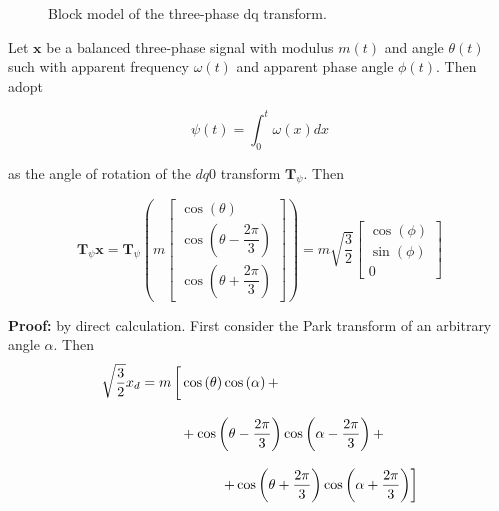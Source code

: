 \begin{figure}
\caption{Block model of the three-phase dq transform.}
\label{fig:dq0_block_modelling}
\end{figure}

\begin{theorem}\label{theo:dq0_balanced_3p} %
Let $\mathbf{x}$ be a balanced three-phase signal with modulus $m(t)$ and angle $\theta(t)$ such with apparent frequency $\omega(t)$ and apparent phase angle $\phi(t)$. Then adopt

\begin{equation} \psi(t) = \int_0^t \omega(x)dx \end{equation}

	as the angle of rotation of the $dq0$ transform $\mathbf{T}_\psi$. Then

\begin{equation} \mathbf{T}_\psi \mathbf{x} = \mathbf{T}_{\psi} \left(m\left[
	\begin{array}{c}
		\cos\left(\theta \right) \\[5mm]
		\cos\left(\theta  - \dfrac{2\pi}{3}\right) \\[5mm]
		\cos\left(\theta  + \dfrac{2\pi}{3}\right)
	\end{array}\right] \right) = 
m\sqrt{\dfrac{3}{2}}\left[
	\begin{array}{c}
		\cos\left(\phi\right) \\[5mm]
		\sin\left(\phi\right) \\[5mm]
		0
	\end{array}\right] 
\end{equation}

\end{theorem}

\textbf{Proof:} by direct calculation. First consider the Park transform of an arbitrary angle $\alpha$. Then
\begin{align}
\sqrt{\dfrac{3}{2}} x_d
	&= m\left[\raisebox{5mm}{}\cos\left(\theta\right)\cos\left(\alpha\right) + \right. \nonumber\\[3mm]
	&\hspace{1cm} +\cos\left(\theta - \dfrac{2\pi}{3}\right)\cos\left(\alpha - \dfrac{2\pi}{3}\right)  + \nonumber\\[3mm]
	&\left. \hspace{2cm} + \cos\left(\theta + \dfrac{2\pi}{3}\right)\cos\left(\alpha + \dfrac{2\pi}{3}\right) \right]
\end{align}

